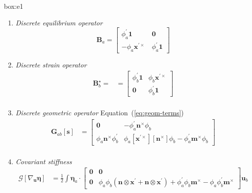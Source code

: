 \begin{ambox}[E1]{box:e1}
\begin{enumerate}
\def\labelenumi{\arabic{enumi}.}
\item
  \emph{Discrete equilibrium operator} 
  \begin{equation*}
   \bm{B}_a = \begin{bmatrix}
       \phi_a^\prime\mathbf{1} & \mathbf{0} \\
       -\phi_a \bm{x}^{\prime\times} \, & \phi_a^{\prime} \mathbf{1}
   \end{bmatrix}
   \end{equation*}
\item
  \emph{Discrete strain operator} 
  \begin{equation*}
   \begin{aligned}
   \bm{B}^{\star}_b =
   &= \begin{bmatrix}
   \phi_b^{\prime} \mathbf{1} & \phi_b \bm{x}^{\prime\times}  \\
   \mathbf{0} & \phi_b^{\prime} \mathbf{1}
   \end{bmatrix} \\
   \end{aligned}
   \end{equation*}
\item
  \emph{Discrete geometric operator}
Equation~(\ref{eq:geom-terms})
    \begin{equation*} 
     \begin{aligned}
     \bm{G}_{ab} [\bm{s}]
     &= \begin{bmatrix}
           \mathbf{0} 
        & -\phi_a^\prime \bm{n}^{\times} \phi_b 
       \\ \phi_a \bm{n}^{\times} \phi_b^\prime 
       & \phi_a[\bm{x}^{\prime\times}][\bm{n}^\times]\phi_b 
       -\phi_a^\prime  \bm{m}^{\times} \phi_b
      \end{bmatrix} \\
     \end{aligned}
     \end{equation*}
\item
  \emph{Covariant stiffness} %
\begin{equation*} 
  \begin{aligned}
  \mathcal{G}\left[\nabla_{\bm{u}} \bm{\eta}\right]
  &= \frac{1}{2}\int \bm{\eta}_a \cdot \begin{bmatrix}
    \mathbf{0} & \mathbf{0} \\
    \mathbf{0} & \phi_a \phi_b \left(\bm{n}\otimes\bm{x}^\prime + \bm{n}\otimes\bm{x}^\prime\right)
                    +\phi_a^\prime \phi_b \bm{m}^\times
                    -\phi_a \phi_b^\prime \bm{m}^\times
  \end{bmatrix}\bm{u}_b
  \end{aligned}
  \end{equation*}
 
\end{enumerate}

\end{ambox}

